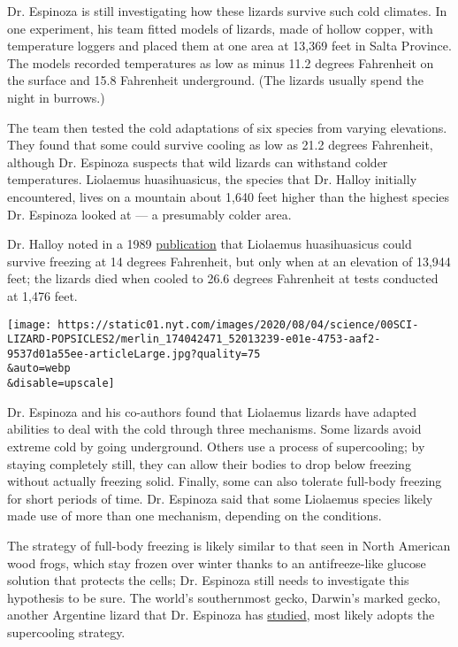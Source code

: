 Dr. Espinoza is still investigating how these lizards survive such cold
climates. In one experiment, his team fitted models of lizards, made of
hollow copper, with temperature loggers and placed them at one area at
13,369 feet in Salta Province. The models recorded temperatures as low
as minus 11.2 degrees Fahrenheit on the surface and 15.8 Fahrenheit
underground. (The lizards usually spend the night in burrows.)

The team then tested the cold adaptations of six species from varying
elevations. They found that some could survive cooling as low as 21.2
degrees Fahrenheit, although Dr. Espinoza suspects that wild lizards can
withstand colder temperatures. Liolaemus huasihuasicus, the species that
Dr. Halloy initially encountered, lives on a mountain about 1,640 feet
higher than the highest species Dr. Espinoza looked at --- a presumably
colder area.

Dr. Halloy noted in a 1989
\href{https://scholarspace.manoa.hawaii.edu/bitstream/10125/1214/v43n2-170-184.pdf}{publication}
that Liolaemus huasihuasicus could survive freezing at 14 degrees
Fahrenheit, but only when at an elevation of 13,944 feet; the lizards
died when cooled to 26.6 degrees Fahrenheit at tests conducted at 1,476
feet.

\texttt{[image: https://static01.nyt.com/images/2020/08/04/science/00SCI-LIZARD-POPSICLES2/merlin\_174042471\_52013239-e01e-4753-aaf2-9537d01a55ee-articleLarge.jpg?quality=75\\\&auto=webp\\\&disable=upscale]}

Dr. Espinoza and his co-authors found that Liolaemus lizards have
adapted abilities to deal with the cold through three mechanisms. Some
lizards avoid extreme cold by going underground. Others use a process of
supercooling; by staying completely still, they can allow their bodies
to drop below freezing without actually freezing solid. Finally, some
can also tolerate full-body freezing for short periods of time. Dr.
Espinoza said that some Liolaemus species likely made use of more than
one mechanism, depending on the conditions.

The strategy of full-body freezing is likely similar to that seen in
North American wood frogs, which stay frozen over winter thanks to an
antifreeze-like glucose solution that protects the cells; Dr. Espinoza
still needs to investigate this hypothesis to be sure. The world's
southernmost gecko, Darwin's marked gecko, another Argentine lizard that
Dr. Espinoza has
\href{https://www.sciencedirect.com/science/article/abs/pii/S030645651300020X}{studied},
most likely adopts the supercooling strategy.

